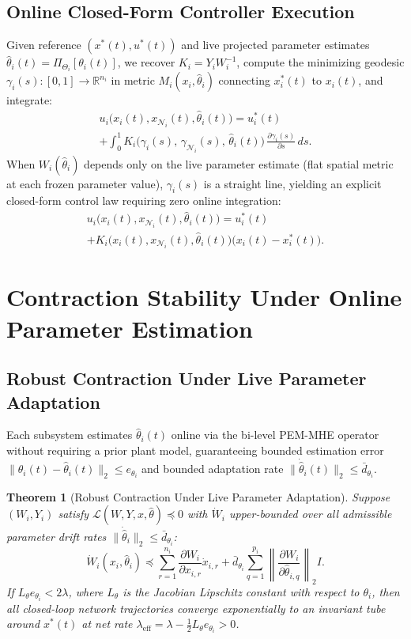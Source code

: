 \documentclass[journal]{IEEEtran}
\newtheorem{theorem}{Theorem}
\begin{document}
\subsection{Online Closed-Form Controller Execution}
Given reference $(x^*(t), u^*(t))$ and live projected parameter estimates $\hat{\theta}_i(t) = \Pi_{\Theta_i}[\theta_i(t)]$, we recover $K_i = Y_i W_i^{-1}$, compute the minimizing geodesic $\gamma_i(s): [0,1] \to \mathbb{R}^{n_i}$ in metric $M_i(x_i, \hat{\theta}_i)$ connecting $x_i^*(t)$ to $x_i(t)$, and integrate:
\begin{multline}
u_i\big(x_i(t), x_{\mathcal{N}_i}(t), \hat{\theta}_i(t)\big) = u_i^*(t) \\
+ \int_{0}^{1} K_i\Big(\gamma_i(s),\, \gamma_{\mathcal{N}_i}(s),\, \hat{\theta}_i(t)\Big)\, \frac{\partial \gamma_i(s)}{\partial s}\, ds.
\end{multline}
When $W_i(\hat{\theta}_i)$ depends only on the live parameter estimate (flat spatial metric at each frozen parameter value), $\gamma_i(s)$ is a straight line, yielding an explicit closed-form control law requiring zero online integration:
\begin{multline}
u_i\big(x_i(t), x_{\mathcal{N}_i}(t), \hat{\theta}_i(t)\big) = u_i^*(t) \\
+ K_i\big(x_i(t), x_{\mathcal{N}_i}(t), \hat{\theta}_i(t)\big)\big(x_i(t) - x_i^*(t)\big).
\end{multline}

\section{Contraction Stability Under Online Parameter Estimation}
\subsection{Robust Contraction Under Live Parameter Adaptation}
Each subsystem estimates $\hat{\theta}_i(t)$ online via the bi-level PEM-MHE operator \cite{zhou24} without requiring a prior plant model, guaranteeing bounded estimation error $\|\theta_i(t) - \hat{\theta}_i(t)\|_2 \le e_{\theta_i}$ and bounded adaptation rate $\|\dot{\hat{\theta}}_i(t)\|_2 \le \bar{d}_{\theta_i}$.

\begin{theorem}[Robust Contraction Under Live Parameter Adaptation]
Suppose $(W_i, Y_i)$ satisfy $\mathcal{L}(W, Y, x, \hat{\theta}) \preceq 0$ with $\dot{W}_i$ upper-bounded over all admissible parameter drift rates $\|\dot{\hat{\theta}}_i\|_2 \le \bar{d}_{\theta_i}$:
\begin{equation}
\dot{W}_i(x_i, \hat{\theta}_i) \preceq \sum_{r=1}^{n_i} \frac{\partial W_i}{\partial x_{i,r}} \dot{x}_{i,r} + \bar{d}_{\theta_i} \sum_{q=1}^{p_i} \left\| \frac{\partial W_i}{\partial \hat{\theta}_{i,q}} \right\|_2 I.
\end{equation}
If $L_{\theta} e_{\theta_i} < 2\lambda$, where $L_{\theta}$ is the Jacobian Lipschitz constant with respect to $\theta_i$, then all closed-loop network trajectories converge exponentially to an invariant tube around $x^*(t)$ at net rate $\lambda_{\text{eff}} = \lambda - \frac{1}{2}L_{\theta} e_{\theta_i} > 0$.
\end{theorem}
\end{document}

